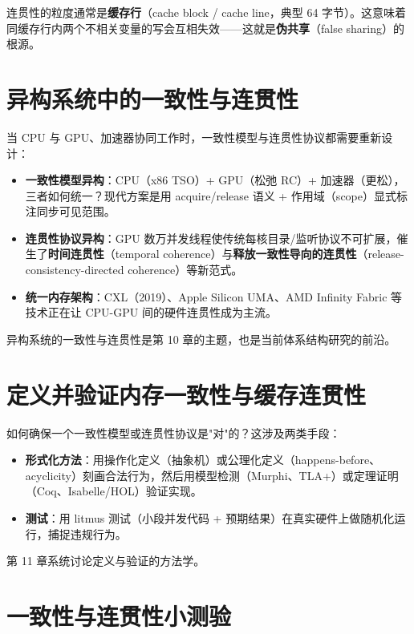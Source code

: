 连贯性的粒度通常是\textbf{缓存行}（cache block / cache line，典型 64 字节）。这意味着同缓存行内两个不相关变量的写会互相失效——这就是\textbf{伪共享}（false sharing）的根源。

\section{异构系统中的一致性与连贯性}

当 CPU 与 GPU、加速器协同工作时，一致性模型与连贯性协议都需要重新设计：

\begin{itemize}
\item \textbf{一致性模型异构}：CPU（x86 TSO）+ GPU（松弛 RC）+ 加速器（更松），三者如何统一？现代方案是用 acquire/release 语义 + 作用域（scope）显式标注同步可见范围。
\item \textbf{连贯性协议异构}：GPU 数万并发线程使传统每核目录/监听协议不可扩展，催生了\textbf{时间连贯性}（temporal coherence）与\textbf{释放一致性导向的连贯性}（release-consistency-directed coherence）等新范式。
\item \textbf{统一内存架构}：CXL（2019）、Apple Silicon UMA、AMD Infinity Fabric 等技术正在让 CPU-GPU 间的硬件连贯性成为主流。
\end{itemize}


异构系统的一致性与连贯性是第 10 章的主题，也是当前体系结构研究的前沿。

\section{定义并验证内存一致性与缓存连贯性}

如何确保一个一致性模型或连贯性协议是"对"的？这涉及两类手段：

\begin{itemize}
\item \textbf{形式化方法}：用操作化定义（抽象机）或公理化定义（happens-before、acyclicity）刻画合法行为，然后用模型检测（Murphi、TLA+）或定理证明（Coq、Isabelle/HOL）验证实现。
\item \textbf{测试}：用 litmus 测试（小段并发代码 + 预期结果）在真实硬件上做随机化运行，捕捉违规行为。
\end{itemize}


第 11 章系统讨论定义与验证的方法学。

\section{一致性与连贯性小测验}

